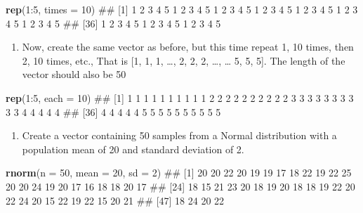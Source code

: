 \documentclass[]{book}
\newenvironment{Shaded}{\begin{snugshade}}{\end{snugshade}}
\newcommand{\KeywordTok}[1]{\textcolor[rgb]{0.13,0.29,0.53}{\textbf{{#1}}}}
\newcommand{\DataTypeTok}[1]{\textcolor[rgb]{0.13,0.29,0.53}{{#1}}}
\newcommand{\DecValTok}[1]{\textcolor[rgb]{0.00,0.00,0.81}{{#1}}}
\newcommand{\NormalTok}[1]{{#1}}
\providecommand{\tightlist}{%
  \setlength{\itemsep}{0pt}\setlength{\parskip}{0pt}}
\theoremstyle{definition}
\theoremstyle{definition}
\theoremstyle{remark}
\begin{document}
\begin{Shaded}
\begin{Highlighting}[]
\KeywordTok{rep}\NormalTok{(}\DecValTok{1}\NormalTok{:}\DecValTok{5}\NormalTok{, }\DataTypeTok{times =} \DecValTok{10}\NormalTok{)}
\NormalTok{##  [1] 1 2 3 4 5 1 2 3 4 5 1 2 3 4 5 1 2 3 4 5 1 2 3 4 5 1 2 3 4 5 1 2 3 4 5}
\NormalTok{## [36] 1 2 3 4 5 1 2 3 4 5 1 2 3 4 5}
\end{Highlighting}
\end{Shaded}

\begin{enumerate}
\def\labelenumi{\arabic{enumi}.}
\setcounter{enumi}{6}
\tightlist
\item
  Now, create the same vector as before, but this time repeat 1, 10
  times, then 2, 10 times, etc., That is {[}1, 1, 1, \ldots{}, 2, 2, 2,
  \ldots{}, \ldots{} 5, 5, 5{]}. The length of the vector should also be
  50
\end{enumerate}

\begin{Shaded}
\begin{Highlighting}[]
\KeywordTok{rep}\NormalTok{(}\DecValTok{1}\NormalTok{:}\DecValTok{5}\NormalTok{, }\DataTypeTok{each =} \DecValTok{10}\NormalTok{)}
\NormalTok{##  [1] 1 1 1 1 1 1 1 1 1 1 2 2 2 2 2 2 2 2 2 2 3 3 3 3 3 3 3 3 3 3 4 4 4 4 4}
\NormalTok{## [36] 4 4 4 4 4 5 5 5 5 5 5 5 5 5 5}
\end{Highlighting}
\end{Shaded}

\begin{enumerate}
\def\labelenumi{\arabic{enumi}.}
\setcounter{enumi}{7}
\tightlist
\item
  Create a vector containing 50 samples from a Normal distribution with
  a population mean of 20 and standard deviation of 2.
\end{enumerate}

\begin{Shaded}
\begin{Highlighting}[]
\KeywordTok{rnorm}\NormalTok{(}\DataTypeTok{n =} \DecValTok{50}\NormalTok{, }\DataTypeTok{mean =} \DecValTok{20}\NormalTok{, }\DataTypeTok{sd =} \DecValTok{2}\NormalTok{)}
\NormalTok{##  [1] 20 20 22 20 19 19 17 18 22 19 22 25 20 20 24 19 20 17 16 18 18 20 17}
\NormalTok{## [24] 18 15 21 23 20 18 19 20 18 18 19 22 20 22 24 20 15 22 19 22 15 20 21}
\NormalTok{## [47] 18 24 20 22}
\end{Highlighting}
\end{Shaded}
\end{document}
